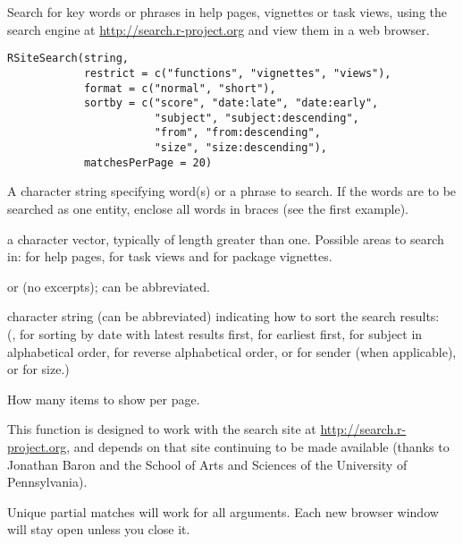 %
\begin{Description}\relax
Search for key words or phrases in
help pages, vignettes or task views, using the search engine
at \url{http://search.r-project.org} and view them in a web browser.
\end{Description}
%
\begin{Usage}
\begin{verbatim}
RSiteSearch(string,
            restrict = c("functions", "vignettes", "views"),
            format = c("normal", "short"),
            sortby = c("score", "date:late", "date:early",
                       "subject", "subject:descending",
                       "from", "from:descending",
                       "size", "size:descending"),
            matchesPerPage = 20)
\end{verbatim}
\end{Usage}
%
\begin{Arguments}
\begin{ldescription}
\item[\code{string}] A character string specifying word(s) or a phrase to
search.  If the words are to be searched as one entity, enclose all
words in braces (see the first example).
\item[\code{restrict}] a character vector, typically of length greater than one.
Possible areas to search in:
 for help pages,
 for task views and
 for package vignettes.
\item[\code{format}]  or  (no excerpts); can be
abbreviated.
\item[\code{sortby}] character string (can be abbreviated) indicating how to
sort the search results:\\{}
(,
 for sorting by date with latest results first,
 for earliest first,
 for subject in alphabetical order,
 for reverse alphabetical order,
 or  for sender (when applicable),
 or  for size.)
\item[\code{matchesPerPage}] How many items to show per page.
\end{ldescription}
\end{Arguments}
%
\begin{Details}\relax
This function is designed to work with the search site at
\url{http://search.r-project.org}, and depends on that site
continuing to be made available (thanks to Jonathan Baron and the
School of Arts and Sciences of the University of Pennsylvania).

Unique partial matches will work for all arguments.  Each new
browser window will stay open unless you close it.
\end{Details}
